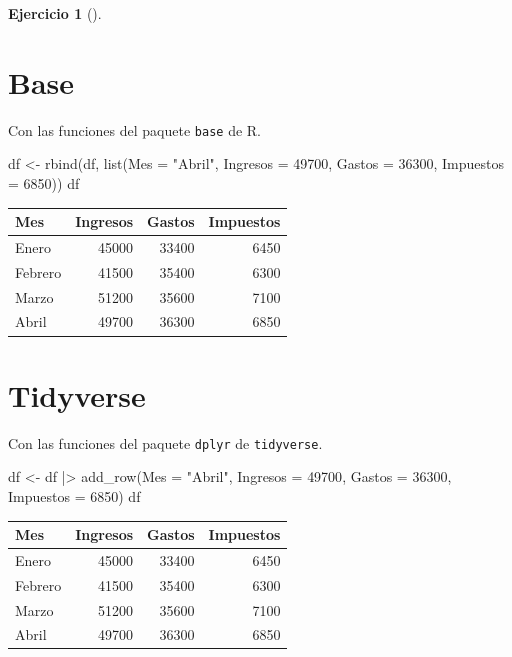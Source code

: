 \documentclass[
  a4paper,
]{scrreport}
\newenvironment{Shaded}{\begin{snugshade}}{\end{snugshade}}
\newcommand{\AttributeTok}[1]{\textcolor[rgb]{0.40,0.45,0.13}{#1}}
\newcommand{\DecValTok}[1]{\textcolor[rgb]{0.68,0.00,0.00}{#1}}
\newcommand{\FunctionTok}[1]{\textcolor[rgb]{0.28,0.35,0.67}{#1}}
\newcommand{\NormalTok}[1]{\textcolor[rgb]{0.00,0.23,0.31}{#1}}
\newcommand{\OtherTok}[1]{\textcolor[rgb]{0.00,0.23,0.31}{#1}}
\newcommand{\SpecialCharTok}[1]{\textcolor[rgb]{0.37,0.37,0.37}{#1}}
\newcommand{\StringTok}[1]{\textcolor[rgb]{0.13,0.47,0.30}{#1}}
\theoremstyle{definition}
\newtheorem{exercise}{Ejercicio}[chapter]
\theoremstyle{remark}
\begin{document}
\begin{exercise}[]
\begin{enumerate}
\begin{tcolorbox}
  \section{Base}

  Con las funciones del paquete \texttt{base} de R.

\begin{Shaded}
\begin{Highlighting}[]
\NormalTok{df }\OtherTok{\textless{}{-}} \FunctionTok{rbind}\NormalTok{(df, }\FunctionTok{list}\NormalTok{(}\AttributeTok{Mes =} \StringTok{"Abril"}\NormalTok{, }\AttributeTok{Ingresos =} \DecValTok{49700}\NormalTok{, }\AttributeTok{Gastos =} \DecValTok{36300}\NormalTok{, }\AttributeTok{Impuestos =} \DecValTok{6850}\NormalTok{))}
\NormalTok{df}
\end{Highlighting}
\end{Shaded}

  \begin{longtable}[]{@{}lrrr@{}}
  \toprule\noalign{}
  Mes & Ingresos & Gastos & Impuestos \\
  \midrule\noalign{}
  \endhead
  \bottomrule\noalign{}
  \endlastfoot
  Enero & 45000 & 33400 & 6450 \\
  Febrero & 41500 & 35400 & 6300 \\
  Marzo & 51200 & 35600 & 7100 \\
  Abril & 49700 & 36300 & 6850 \\
  \end{longtable}

  \section{Tidyverse}

  Con las funciones del paquete \texttt{dplyr} de \texttt{tidyverse}.

\begin{Shaded}
\begin{Highlighting}[]
\NormalTok{df }\OtherTok{\textless{}{-}}\NormalTok{ df }\SpecialCharTok{|\textgreater{}} \FunctionTok{add\_row}\NormalTok{(}\AttributeTok{Mes =} \StringTok{"Abril"}\NormalTok{, }\AttributeTok{Ingresos =} \DecValTok{49700}\NormalTok{, }\AttributeTok{Gastos =} \DecValTok{36300}\NormalTok{, }\AttributeTok{Impuestos =} \DecValTok{6850}\NormalTok{)}
\NormalTok{df}
\end{Highlighting}
\end{Shaded}

  \begin{longtable}[]{@{}lrrr@{}}
  \toprule\noalign{}
  Mes & Ingresos & Gastos & Impuestos \\
  \midrule\noalign{}
  \endhead
  \bottomrule\noalign{}
  \endlastfoot
  Enero & 45000 & 33400 & 6450 \\
  Febrero & 41500 & 35400 & 6300 \\
  Marzo & 51200 & 35600 & 7100 \\
  Abril & 49700 & 36300 & 6850 \\
  \end{longtable}


\end{tcolorbox}
\end{enumerate}
\end{exercise}
\end{document}
